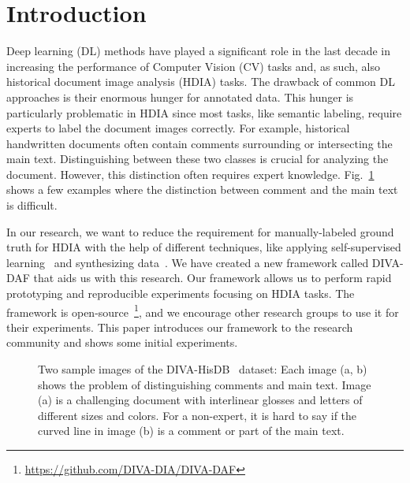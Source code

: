 \documentclass[runningheads]{llncs}
\begin{document}
\section{Introduction}
Deep learning (DL) methods have played a significant role in the last decade in increasing the performance of Computer Vision (CV) tasks and, as such, also historical document image analysis (HDIA) tasks. The drawback of common DL approaches is their enormous hunger for annotated data. This hunger is particularly problematic in HDIA since most tasks, like semantic labeling, require experts to label the document images correctly. For example, historical handwritten documents often contain comments surrounding or intersecting the main text. Distinguishing between these two classes is crucial for analyzing the document. However, this distinction often requires expert knowledge. Fig.~\ref{fig:hisdoc_problems} shows a few examples where the distinction between comment and the main text is difficult.

In our research, we want to reduce the requirement for manually-labeled ground truth for HDIA with the help of different techniques, like applying self-supervised learning~\cite{jingSelfsupervisedVisualFeature2020,cosmaSelfsupervisedRepresentationLearning2020} and synthesizing data~\cite{vogtlinGeneratingSyntheticHandwritten2021a}. We have created a new framework called DIVA-DAF that aids us with this research. Our framework allows us to perform rapid prototyping and reproducible experiments focusing on HDIA tasks. The framework is open-source~\footnote{\url{https://github.com/DIVA-DIA/DIVA-DAF}}, and we encourage other research groups to use it for their experiments. This paper introduces our framework to the research community and shows some initial experiments.







\begin{figure}[h!]
    \centering
{}
    \vfill
    \caption{
    Two sample images of the DIVA-HisDB~\cite{simistiraDIVAHisDBPreciselyAnnotated2016} dataset: Each image (a, b) shows the problem of distinguishing comments and main text. Image (a) is a challenging document with interlinear glosses and letters of different sizes and colors. For a non-expert, it is hard to say if the curved line in image (b) is a comment or part of the main text.
}
    \label{fig:hisdoc_problems}
\end{figure}
\end{document}
